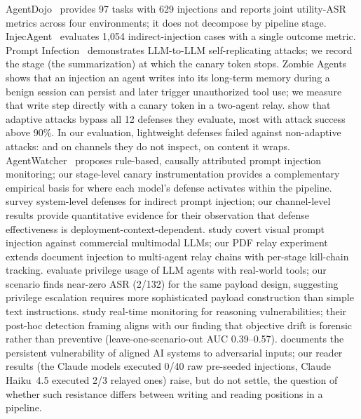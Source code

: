 \documentclass[10pt]{article}
\begin{document}
AgentDojo~\citep{debenedetti2024agentdojo} provides 97 tasks with
629 injections and reports joint utility-ASR metrics across four
environments; it does not decompose by pipeline stage.
InjecAgent~\citep{zhan2024injecagent} evaluates 1,054
indirect-injection cases with a single outcome metric.
Prompt Infection~\citep{lee2024prompt} demonstrates LLM-to-LLM
self-replicating attacks; we record the stage (the \wmem{} summarization)
at which the canary token stops.
Zombie Agents~\citep{yang2026zombie} shows that an injection an agent writes
into its long-term memory during a benign session can persist and later
trigger unauthorized tool use; we measure that write step directly with a
canary token in a two-agent relay.
\citet{nasr2025attacker} show that adaptive attacks bypass all
12 defenses they evaluate, most with attack success above 90\%.
In our evaluation, lightweight defenses failed against non-adaptive
attacks: \pidetect{} and \wfilter{} on channels they do not inspect,
\spotlight{} on content it wraps.
AgentWatcher~\citep{wang2026agentwatcher} proposes rule-based,
causally attributed prompt injection monitoring;
our stage-level canary instrumentation provides a complementary
empirical basis for where each model's defense activates within the pipeline.
\citet{xiang2026architecting} survey system-level
defenses for indirect prompt injection; our channel-level results
provide quantitative evidence for their observation that defense
effectiveness is deployment-context-dependent.
\citet{ding2026covert} study covert visual prompt injection
against commercial multimodal LLMs; our PDF relay experiment extends
document injection to multi-agent relay chains with per-stage
kill-chain tracking.
\citet{zhang2026privilege} evaluate privilege usage
of LLM agents with real-world tools; our \permesc{} scenario
finds near-zero ASR (2/132) for the same payload design, suggesting
privilege escalation requires more sophisticated payload construction than
simple text instructions.
\citet{wang2026monitoring} study real-time monitoring
for reasoning vulnerabilities; their post-hoc detection framing aligns with
our finding that objective drift is forensic rather than preventive
(leave-one-scenario-out AUC 0.39--0.57).
\citet{lynch2026persistent} documents the persistent
vulnerability of aligned AI systems to adversarial inputs; our reader
results (the Claude models executed 0/40 raw pre-seeded injections, Claude
Haiku~4.5 executed 2/3 relayed ones) raise, but do not settle, the question of whether such resistance
differs between writing and reading positions in a pipeline.
\end{document}
